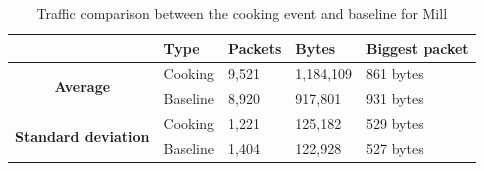 \begin{table}[H]
    \centering
    \caption{Traffic comparison between the cooking event and baseline for Mill}
    \begin{tabular}{c|l|l|l|l|}
        \cline{2-5}
        \multicolumn{1}{l|}{}                                              & \textbf{Type} & \textbf{Packets} & \textbf{Bytes} & \textbf{Biggest packet} \\ \hline
        \multicolumn{1}{|c|}{\multirow{2}{*}{\textbf{Average}}}            & Cooking         & 9,521              & 1,184,109       & 861 bytes               \\ \cline{2-5} 
        \multicolumn{1}{|c|}{}                                             & Baseline      & 8,920              & 917,801         & 931 bytes                \\ \hline
        \multicolumn{1}{|c|}{\multirow{2}{*}{\textbf{Standard deviation}}} & Cooking         & 1,221              & 125,182         & 529 bytes                 \\ \cline{2-5} 
        \multicolumn{1}{|c|}{}                                             & Baseline      & 1,404               & 122,928       &  527 bytes               \\ \hline          
    \end{tabular}
    \label{tab:MillComparingBaselineAndCookingCalculations}
\end{table}

